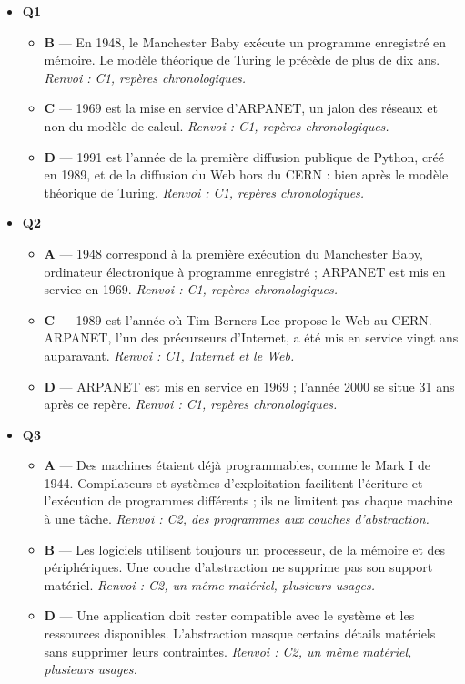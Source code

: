 \begin{itemize}
  \item \textbf{Q1}
  \begin{itemize}
    \item \textbf{B} — En 1948, le Manchester Baby exécute un programme enregistré en mémoire. Le modèle théorique de Turing le précède de plus de dix ans. \emph{Renvoi : C1, repères chronologiques.}
    \item \textbf{C} — 1969 est la mise en service d'ARPANET, un jalon des réseaux et non du modèle de calcul. \emph{Renvoi : C1, repères chronologiques.}
    \item \textbf{D} — 1991 est l'année de la première diffusion publique de Python, créé en 1989, et de la diffusion du Web hors du CERN : bien après le modèle théorique de Turing. \emph{Renvoi : C1, repères chronologiques.}
  \end{itemize}
  \item \textbf{Q2}
  \begin{itemize}
    \item \textbf{A} — 1948 correspond à la première exécution du Manchester Baby, ordinateur électronique à programme enregistré ; ARPANET est mis en service en 1969. \emph{Renvoi : C1, repères chronologiques.}
    \item \textbf{C} — 1989 est l'année où Tim Berners-Lee propose le Web au CERN. ARPANET, l'un des précurseurs d'Internet, a été mis en service vingt ans auparavant. \emph{Renvoi : C1, Internet et le Web.}
    \item \textbf{D} — ARPANET est mis en service en 1969 ; l'année 2000 se situe 31 ans après ce repère. \emph{Renvoi : C1, repères chronologiques.}
  \end{itemize}
  \item \textbf{Q3}
  \begin{itemize}
    \item \textbf{A} — Des machines étaient déjà programmables, comme le Mark I de 1944. Compilateurs et systèmes d'exploitation facilitent l'écriture et l'exécution de programmes différents ; ils ne limitent pas chaque machine à une tâche. \emph{Renvoi : C2, des programmes aux couches d'abstraction.}
    \item \textbf{B} — Les logiciels utilisent toujours un processeur, de la mémoire et des périphériques. Une couche d'abstraction ne supprime pas son support matériel. \emph{Renvoi : C2, un même matériel, plusieurs usages.}
    \item \textbf{D} — Une application doit rester compatible avec le système et les ressources disponibles. L'abstraction masque certains détails matériels sans supprimer leurs contraintes. \emph{Renvoi : C2, un même matériel, plusieurs usages.}

\end{itemize}
\end{itemize}
